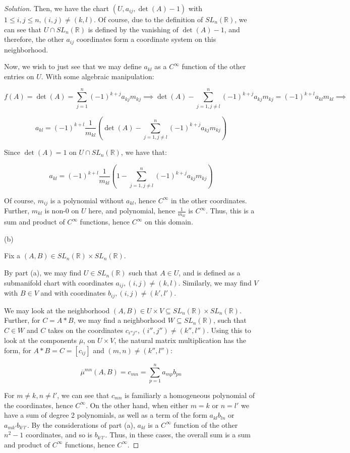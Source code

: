 \documentclass[10pt]{article}
\theoremstyle{nonumberplain}%
\begin{document}
\begin{proof}[Solution]
Then, we have the chart $(U, a_{ij}, \det(A) - 1)$ with $1 \leq i, j \leq n, (i,j) \not = (k,l)$. Of course, due to the definition of $SL_n(\mathbb{R})$, we can see that $U \cap SL_n(\mathbb{R})$ is defined by the vanishing of $\det(A)-1$, and therefore, the other $a_{ij}$ coordinates form a coordinate system on this neighborhood.

Now, we wish to just see that we may define $a_{kl}$ as a $C^\infty$ function of the other entries on $U$. With some algebraic manipulation:

$$ f(A) = \det(A) = \sum_{j=1}^n (-1)^{k+j} a_{kj}m_{kj} \implies \det(A) - \sum_{j=1, j\not=l}^n   (-1)^{k+j} a_{kj}m_{kj} = (-1)^{k+l} a_{kl}m_{kl} \implies$$

$$ a_{kl} = (-1)^{k+l} \frac{1}{m_{kl}} \left(  \det(A) - \sum_{j=1, j\not=l}^n   (-1)^{k+j} a_{kj}m_{kj} \right) $$

Since $\det(A) = 1$ on $U \cap SL_n(\mathbb{R})$, we have that:

$$  a_{kl} =  (-1)^{k+l} \frac{1}{m_{kl}} \left(  1 - \sum_{j=1, j\not=l}^n   (-1)^{k+j} a_{kj}m_{kj} \right)$$

Of course, $m_{ij}$ is a polynomial without $a_{kl}$, hence $C^\infty$ in the other coordinates. Further, $m_{kl}$ is non-0 on $U$ here, and polynomial, hence $\frac{1}{m_{kl}}$ is $C^\infty$. Thus, this is a sum and product of $C^\infty$ functions, hence $C^\infty$ on this domain.

(b)

Fix a $(A, B) \in SL_n(\mathbb{R}) \times SL_n(\mathbb{R})$. 

By part (a), we may find $U \in SL_n(\mathbb{R})$ such that $A \in U$, and is defined as a submanifold chart with coordinates $a_{ij}, (i,j) \not = (k,l)$. Similarly, we may find $V$ with $B \in V$ and with coordinates $b_{ij}, (i,j) \not =(k', l')$.

We may look at the neighborhood $(A,B) \in U \times V \subseteq  SL_n(\mathbb{R}) \times SL_n(\mathbb{R})$. Further, for $C = A*B$, we may find a neighborhood $W \subseteq SL_n(\mathbb{R})$, such that $C \in W$ and $C$ takes on the coordinates $c_{i''j''}, (i'', j'') \not = (k'', l'')$. Using this to look at the components $\overline{\mu}$, on $U\times V$, the natural matrix multiplication has the form, for $A*B = C= [c_{ij}]$ and $(m,n) \not = (k'', l'')$:

$$ \overline{\mu}^{mn}(A,B) =  c_{mn} = \sum_{p=1}^n a_{mp}b_{pn}$$

For $m \not = k, n \not = l'$, we can see that $c_{mn}$ is familiarly a homogeneous polynomial of the coordinates, hence $C^\infty$. On the other hand, when either $m=k$ or $n=l'$ we have a sum of degree 2 polynomials, as well as a term of the form $a_{kl}b_{ln}$ or $a_{mk'}b_{k'l'}$. By the considerations of part (a), $a_{kl}$ is a $C^\infty$ function of the other $n^2-1$ coordinates, and so is $b_{k'l'}$. Thus, in these cases, the overall sum is a sum and product of $C^\infty$ functions, hence $C^\infty$.


\end{proof}
\end{document}
